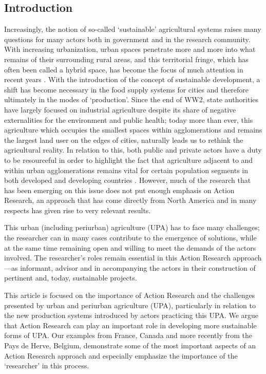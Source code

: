 \documentclass[10pt,a4paper]{article}
\begin{document}
\begin{multicols}{2}

\section{Introduction}
\noindent Increasingly, the notion of so-called `sustainable' agricultural systems raises many questions for many actors both in government and in the research community. With increasing urbanization, urban spaces penetrate more and more into what remains of their surrounding rural areas, and this territorial fringe, which has often been called a hybrid space, has become the focus of much attention in recent years \citep{r01}.  With the introduction of the concept of sustainable development, a shift has become necessary in the food supply systems for cities and therefore ultimately in the modes of `production'. Since the end of WW2, state authorities have largely focused on industrial agriculture despite its share of negative externalities for the environment and public health; today more than ever, this agriculture which occupies the smallest spaces within agglomerations and remains the largest land user on the edges of cities, naturally leads us to rethink the agricultural reality. In relation to this, both public and private actors have a duty to be resourceful in order to highlight the fact that agriculture adjacent to and within urban agglomerations remains vital for certain population segments in both developed and developing countries \citep{r02}. However, much of the research that has been emerging on this issue does not put enough emphasis on Action Research, an approach that has come directly from North America and in many respects has given rise to very relevant results.

 This urban (including periurban) agriculture (UPA) has to face many challenges; the researcher can in many cases contribute to the emergence of solutions, while at the same time remaining open and willing to meet the demands of the actors involved. The researcher's roles remain essential in this Action Research approach---as informant, advisor and in accompanying the actors in their construction of pertinent and, today, sustainable projects.
 
This article is focused on the importance of Action Research and the challenges presented by urban and periurban agriculture (UPA), particularly in relation to the new production systems introduced by actors practicing this UPA. We argue that Action Research can play an important role in developing more sustainable forms of UPA. Our examples from France, Canada and more recently from the Pays de Herve, Belgium, demonstrate some of the most important aspects of an Action Research approach and especially emphasize the importance of the `researcher' in this process.


\end{multicols}
\end{document}
